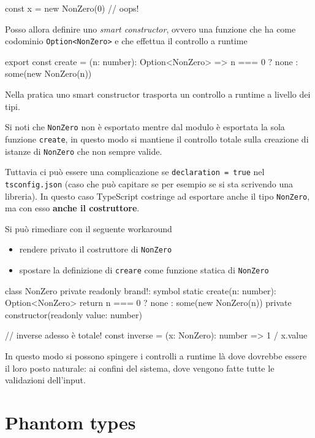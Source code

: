 \documentclass[12pt]{article}
\theoremstyle{definition}
\newenvironment{code}
  {\vspace{0.5cm} \VerbatimEnvironment\begin{typescriptcode}}
  {\end{typescriptcode} \vspace{0.2cm}}
\begin{document}
\begin{code}
const x = new NonZero(0) // oops!
\end{code}

Posso allora definire uno \emph{smart constructor}, ovvero una funzione che ha come codominio \texttt{Option<NonZero>} e che
effettua il controllo a runtime

\begin{code}
export const create = (n: number): Option<NonZero> =>
  n === 0 ? none : some(new NonZero(n))
\end{code}

Nella pratica uno smart constructor trasporta un controllo a runtime a livello dei tipi.

Si noti che \texttt{NonZero} non è esportato mentre dal modulo è esportata la sola funzione \texttt{create}, in questo
modo si mantiene il controllo totale sulla creazione di istanze di \texttt{NonZero} che non sempre valide.

Tuttavia ci può essere una complicazione se \texttt{declaration = true} nel \texttt{tsconfig.json}
(caso che può capitare se per esempio se si sta scrivendo una libreria). In questo caso
TypeScript costringe ad esportare anche il tipo \texttt{NonZero}, ma con esso \textbf{anche il costruttore}.

Si può rimediare con il seguente workaround

\begin{itemize}
\item rendere privato il costruttore di \texttt{NonZero}
\item spostare la definizione di \texttt{creare} come funzione statica di \texttt{NonZero}
\end{itemize}

\begin{code}
class NonZero {
  private readonly brand!: symbol
  static create(n: number): Option<NonZero> {
    return n === 0 ? none : some(new NonZero(n))
  }
  private constructor(readonly value: number) {}
}

// inverse adesso è totale!
const inverse = (x: NonZero): number => 1 / x.value
\end{code}

In questo modo si possono spingere i controlli a runtime là dove dovrebbe essere il loro posto naturale: ai confini del sistema,
dove vengono fatte tutte le validazioni dell'input.

\newpage
\section{Phantom types}
\end{document}
